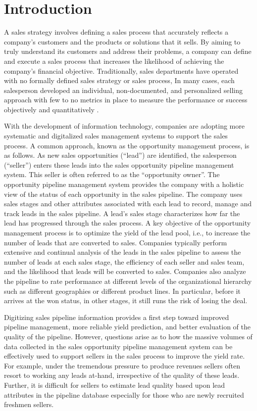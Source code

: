 \documentclass[10pt,conference]{IEEEtran}
\begin{document}
\IEEEpeerreviewmaketitle
\section{Introduction}
A sales strategy involves defining a sales process that accurately reflects a company's customers and the products or solutions that it sells. By aiming to truly understand its customers and address their problems, a company can define and execute a sales process that increases the likelihood of achieving the company's financial objective. Traditionally, sales departments have operated with no formally defined sales strategy or sales process, In many cases, each salesperson developed an individual, non-documented, and personalized selling approach with few to no metrics in place to measure the performance or success objectively and quantitatively \cite{vavricka1997implementing}.

With the development of information technology, companies are adopting more systematic and digitalized sales management systems\cite{selden1996sales,selden2000power} to support the sales process. A common approach, known as the opportunity management process, is as follows. As new sales opportunities (``lead'') are identified, the salesperson (``seller'') enters these leads into the sales opportunity pipeline management system. This seller is often referred to as the ``opportunity owner''. The opportunity pipeline management system provides the company with a holistic view of the status of each opportunity in the sales pipeline\cite{selden1996sales}. The company uses sales stages and other attributes associated with each lead to record, manage and track leads in the sales pipeline. A lead's sales stage characterizes how far the lead has progressed through the sales process. A key objective of the opportunity management process is to optimize the yield of the lead pool, i.e., to increase the number of leads that are converted to sales. Companies typically perform extensive and continual analysis of the leads in the sales pipeline to assess the number of leads at each sales stage, the efficiency of each seller and sales team, and the likelihood that leads will be converted to sales. Companies also analyze the pipeline to rate performance at different levels of the organizational hierarchy such as different geographies or different product lines. In particular, before it arrives at the won status, in other stages, it still runs the risk of losing the deal.

Digitizing sales pipeline information provides a first step toward improved pipeline management, more reliable yield prediction, and better evaluation of the quality of the pipeline. However, questions arise as to how the massive volumes of data collected in the sales opportunity pipeline management system can be effectively used to support sellers in the sales process to improve the yield rate. For example, under the tremendous pressure to produce revenues sellers often resort to working any leads at-hand, irrespective of the quality of these leads. Further, it is difficult for sellers to estimate lead quality based upon lead attributes in the pipeline database especially for those who are newly recruited freshmen sellers.
\end{document}
